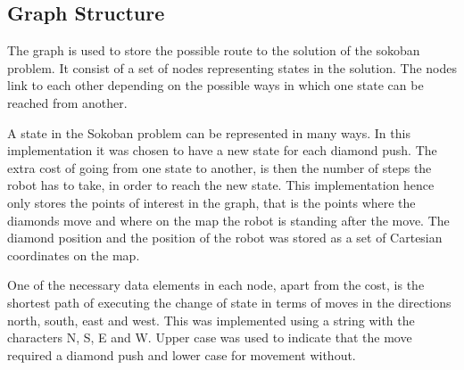 
\subsection{Graph Structure}
The graph is used to store the possible route to the solution of the sokoban problem.
It consist of a set of nodes representing states in the solution.
The nodes link to each other depending on the possible ways in which one state can be reached from another.

A state in the Sokoban problem can be represented in many ways.
In this implementation it was chosen to have a new state for each diamond push.
The extra cost of going from one state to another, is then the number of steps the robot has to take, in order to reach the new state.
This implementation hence only stores the points of interest in the graph, that is the points where the diamonds move and where on the map the robot is standing after the move.
The diamond position and the position of the robot was stored as a set of Cartesian coordinates on the map.

One of the necessary data elements in each node, apart from the cost, is the shortest path of executing the change of state in terms of moves in the directions north, south, east and west.
This was implemented using a string with the characters N, S, E and W.
Upper case was used to indicate that the move required a diamond push and lower case for movement without.



